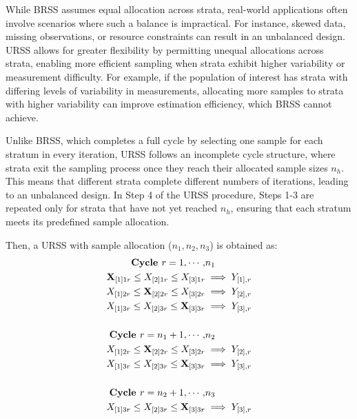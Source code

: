 While BRSS assumes equal allocation across strata, real-world applications often involve scenarios where such a balance is impractical. For instance, skewed data, missing observations, or resource constraints can result in an unbalanced design. URSS allows for greater flexibility by permitting unequal allocations across strata, enabling more efficient sampling when strata exhibit higher variability or measurement difficulty. For example, if the population of interest has strata with differing levels of variability in measurements, allocating more samples to strata with higher variability can improve estimation efficiency, which BRSS cannot achieve. 

Unlike BRSS, which completes a full cycle by selecting one sample for each stratum in every iteration, URSS follows an incomplete cycle structure, where strata exit the sampling process once they reach their allocated sample sizes $n_h$. This means that different strata complete different numbers of iterations, leading to an unbalanced design. In Step 4 of the URSS procedure, Steps 1-3 are repeated only for strata that have not yet reached $n_h$, ensuring that each stratum meets its predefined sample allocation.

 Then, a URSS with sample allocation ($n_1, n_2, n_3$) is obtained as:
\[
\begin{aligned}
\textbf{Cycle $r=1,\cdots,$} &\textbf{$n_1$} \\
{\bf X}_{[1]1r} \leq X_{[2]1r} \leq X_{[3]1r} &\implies Y_{[1],r} \\
X_{[1]2r} \leq {\bf X}_{[2]2r} \leq X_{[3]2r} &\implies Y_{[2],r} \\
X_{[1]3r} \leq X_{[2]3r} \leq {\bf X}_{[3]3r} &\implies Y_{[3],r} \\
\\
\textbf{Cycle $r=n_1+1,\cdots,$} & \textbf{$n_2$} \\
X_{[1]2r} \leq {\bf X}_{[2]2r} \leq X_{[3]2r} &\implies Y_{[2],r} \\
X_{[1]3r} \leq X_{[2]3r} \leq {\bf X}_{[3]3r} &\implies Y_{[3],r} \\
\\
\textbf{Cycle $r=n_2+1,\cdots,$} &\textbf{$n_3$} \\
X_{[1]3r} \leq X_{[2]3r} \leq {\bf X}_{[3]3r} &\implies Y_{[3],r} \\
\end{aligned}
\]

